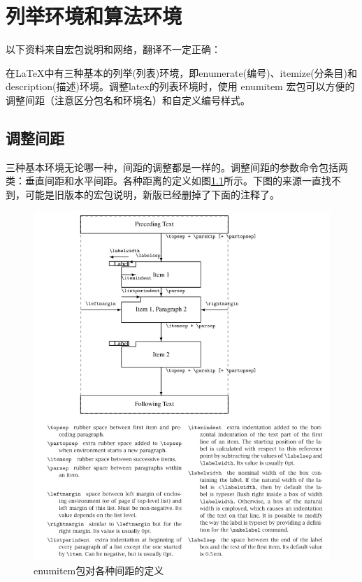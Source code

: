 \chapter{列举环境和算法环境}
以下资料来自宏包说明和网络，翻译不一定正确：

在LaTeX中有三种基本的列举(列表)环境，即enumerate(编号)、itemize(分条目)和description(描述)环境。调整latex的列表环境时，使用 enumitem 宏包可以方便的调整间距（注意区分包名和环境名）和自定义编号样式。

\section{调整间距}
三种基本环境无论哪一种，间距的调整都是一样的。调整间距的参数命令包括两类：垂直间距和水平间距。各种距离的定义如图\ref{enumitem}所示。下图的来源一直找不到，可能是旧版本的宏包说明，新版已经删掉了下面的注释了。
\begin{figure}[htbp]
	\centering
	\includegraphics[scale=0.6]{Fig/enumitem1.png}
	\caption{\label{enumitem}enumitem包对各种间距的定义}
\end{figure}

